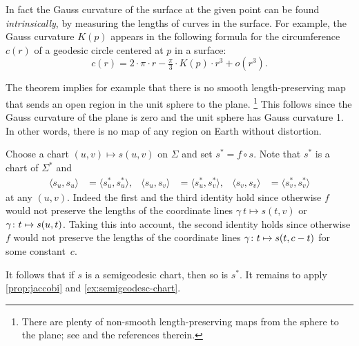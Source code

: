 In fact the Gauss curvature of the surface at the given point can be found {}\emph{intrinsically},
by measuring the lengths of curves in the surface.
For example, the Gauss curvature $K(p)$ appears in the following formula for the circumference $c(r)$ of a geodesic circle centered at $p$ in a surface: 
\[c(r)=2\cdot\pi\cdot r-\tfrac\pi3\cdot K(p)\cdot r^3+o(r^3).\]

The theorem implies for example that there is no smooth length-preserving map that sends an open region in the unit sphere to the plane.%
\footnote{There are plenty of non-smooth length-preserving maps from the sphere to the plane; see \cite{petrunin-yashinski} and the references therein.}
This follows since the Gauss curvature of the plane is zero and the unit sphere has Gauss curvature 1. 
In other words, there is no map of any region on Earth without distortion.

 Choose a chart $(u,v)\mapsto s(u,v)$ on $\Sigma$ and set
$s^{*} =f\circ s$.
Note that $s^{*}$ is a chart of $\Sigma^{*}$ and 
\begin{align*}
\langle s_u,s_u\rangle
&=
\langle s_u^{*}, s_u^{*}\rangle,
&
\langle s_u, s_v\rangle
&=
\langle s_u^{*}, s_v^{*}\rangle,
&
\langle s_v, s_v\rangle
&=
\langle s_v^{*}, s_v^{*}\rangle
\end{align*}
at any $(u,v)$.
Indeed the first and the third identity hold since otherwise $f$ would not preserve the lengths of the coordinate lines $\gamma\:t\mapsto s(t,v)$ or  $\gamma\:t\z\mapsto s(u,t)$.
Taking this into account, the second identity holds since otherwise $f$ would not preserve the lengths of the coordinate lines $\gamma\:t\z\mapsto s(t,c-t)$ for some constant~$c$.

It follows that if $s$ is a semigeodesic chart,
then so is $s^{*}$.
It remains to apply \ref{prop:jaccobi} and \ref{ex:semigeodesc-chart}.
\qeds
